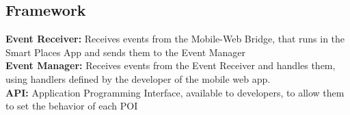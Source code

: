\subsection{Framework}
\label{sub:framework}
\textbf{Event Receiver:} 
Receives events from the Mobile-Web Bridge,
that runs in the Smart Places App and sends them to the
Event Manager
\\
\textbf{Event Manager:} 
Receives events from the Event Receiver and handles them, using
handlers defined by the developer of the mobile web app.
\\
\textbf{API:} 
Application Programming Interface, available to developers, to 
allow them to set the behavior of each POI
\\
